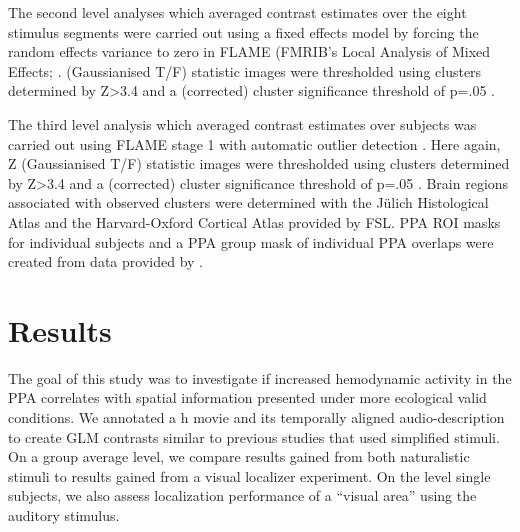 \documentclass[english]{article}
\begin{document}
The second level analyses which averaged contrast estimates over the eight
stimulus segments were carried out using a fixed effects model by forcing the
random effects variance to zero in FLAME (FMRIB's Local Analysis of Mixed
Effects; \citep{beckmann2003general, woolrich2004multilevel}.
(Gaussianised T/F) statistic images were thresholded using clusters determined
by Z>3.4 and a (corrected) cluster significance threshold of p=.05
\citep{worsley2001statistical}.

The third level analysis which averaged contrast estimates over subjects was
carried out using FLAME stage 1 with automatic outlier detection
\citep{beckmann2003general, woolrich2004multilevel, woolrich2008robust}.
Here again, Z (Gaussianised T/F) statistic images were thresholded using
clusters determined by Z>3.4 and a (corrected) cluster significance threshold of
p=.05 \citep{worsley2001statistical}.
Brain regions associated with observed clusters were determined with the Jülich
Histological Atlas \citep{eickhoff2005toolbox, eickhoff2007assignment} and the
Harvard-Oxford Cortical Atlas \citep{desikan2006automated} provided by FSL.
PPA ROI masks for individual subjects and a PPA group mask of individual PPA
overlaps were created from data provided by \citep{sengupta2016extension}.


\section{Results}


The goal of this study was to investigate if increased hemodynamic activity in
the PPA correlates with spatial information presented under more ecological
valid conditions.
We annotated a \unit[2]{h} movie and its temporally aligned audio-description to
create GLM contrasts similar to previous studies that used simplified stimuli.
On a group average level, we compare results gained from both naturalistic
stimuli to results gained from a visual localizer experiment.
On the level single subjects, we also assess localization performance of a
``visual area'' using the auditory stimulus.
\end{document}
